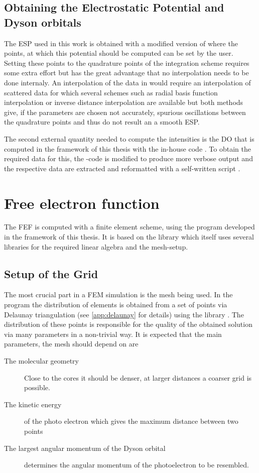\subsection{Obtaining the Electrostatic Potential and Dyson orbitals}
The ESP used in this work is obtained with a modified version of  \cite{nwchem} where the points, at which this potential should be computed can be set by the user.
Setting these points to the quadrature points of the integration scheme requires some extra effort but has the great advantage that no interpolation needs to be done internaly.
An interpolation of the data in  \cite{FreeWilly} would require an interpolation of scattered data for which several schemes such as radial basis function interpolation or inverse distance interpolation are available but both methods give, if the parameters are chosen not accurately, spurious oscillations between the quadrature points and thus do not result an a smooth ESP.

The second external quantity needed to compute the intensities is the DO that is computed in the framework of this thesis with the in-house code  \cite{MAgg}.
To obtain the required data for this, the -code is modified to produce more verbose output and the respective data are extracted and reformatted with a self-written script \cite{nwc2dy}.

\section{Free electron function}
The FEF is computed with a finite element scheme, using the program  \cite{FreeWilly} developed in the framework of this thesis.
It is based on the library  \cite{libmesh} which itself uses several libraries for the required linear algebra and the mesh-setup.

\subsection{Setup of the Grid}
\label{sec:grid}
The most crucial part in a FEM simulation is the mesh being used. 
In the program  the distribution of elements is obtained from a set of points via Delaunay triangulation (see \ref{app:delaunay} for details) using the library  \cite{tetgen}.
The distribution of these points is responsible for the quality of the obtained solution via many parameters in a non-trivial way.
It is expected that the main parameters, the mesh should depend on are
\begin{description}
   \item[The molecular geometry] Close to the cores it should be denser, at larger distances a coarser grid is possible.
   \item[The kinetic energy] of the photo electron which gives the maximum distance between two points
   \item[The largest angular momentum of the Dyson orbital] determines the angular momentum of the photoelectron to be resembled.
\end{description}

